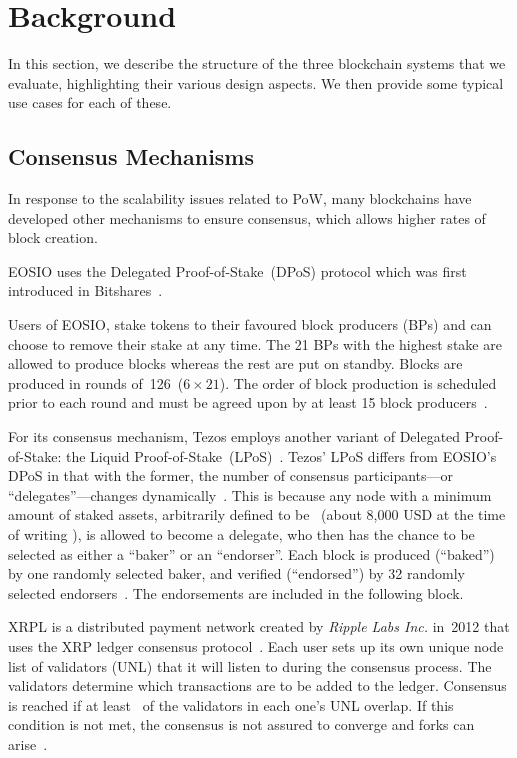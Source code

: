 \section{Background}
\label{sec:4:background}

In this section, we describe the structure of the three blockchain systems that we evaluate, highlighting their various design aspects. We then provide some typical use cases for each of these.

\subsection{Consensus Mechanisms}

In response to the scalability issues related to PoW, many blockchains have developed other mechanisms to ensure consensus, which allows higher rates of block creation.

\label{sec:DPoS}
EOSIO uses the Delegated Proof-of-Stake~(DPoS) protocol which was first introduced in Bitshares~\cite{bitshares}.

Users of EOSIO, stake  tokens to their favoured block producers (BPs) and can choose to remove their stake at any time.
The 21 BPs with the highest stake are allowed to produce blocks whereas the rest are put on standby.
Blocks are produced in rounds of~126~($6 \times 21$).
The order of block production is scheduled prior to each round and must be agreed upon by at least 15 block producers~\cite{EOS}.


For its consensus mechanism, Tezos employs another variant of Delegated Proof-of-Stake: the Liquid Proof-of-Stake~(LPoS)~\cite{Tezos2018}.
Tezos' LPoS differs from EOSIO's DPoS in that with the former, the number of consensus participants---or ``delegates''---changes dynamically~\cite{Tezos2018, Goodman2014}.
This is because any node with a minimum amount of staked assets, arbitrarily defined to be~  (about 8,000 USD at the time of writing \cite{CoinMarketCap2020}), is allowed to become a delegate, who then has the chance to be selected as either a ``baker'' or an ``endorser''.
Each block is produced (``baked'') by one randomly selected baker, and verified (``endorsed'') by 32 randomly selected endorsers~\cite{Tezos2018}.
The endorsements are included in the following block.

XRPL is a distributed payment network created by \textit{Ripple Labs Inc.} in~2012 that uses the XRP ledger consensus protocol~\cite{Chase2018}.
Each user sets up its own unique node list of validators (UNL) that it will listen to during the consensus process.
The validators determine which transactions are to be added to the ledger.
Consensus is reached if at least~ of the validators in each one's UNL overlap. If this condition is not met, the consensus is not assured to converge and forks can arise~\cite{Chase2018}.

